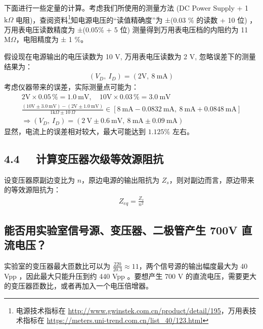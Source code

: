 \documentclass[UTF8]{article}
\begin{document}
下面进行一些定量的计算。考虑我们所使用的测量方法 (DC Power Supply + 1 $\mathrm{k}\Omega$ 电阻)，查阅资料\footnote{电源技术指标在 \href{http://www.gwinstek.com.cn/product/detail/195}{http://www.gwinstek.com.cn/product/detail/195}，万用表技术指标在 \href{https://meters.uni-trend.com.cn/list\_40/123.html}{https://meters.uni-trend.com.cn/list\_40/123.html}}知电源电压的“读值精确度”为 ±(0.03 \% 的读数 + 10 位) ，万用表电压读数精度为 ±(0.05\% + 5 位) 测量得到万用表电压档的内阻约为 11 $\mathrm{M}\Omega$，电阻精度为 ± 1 \%。

假设现在电源输出的电压读数为 10 V, 万用表电压读数为 2 V, 忽略误差下的测量结果为：
\begin{gather}
(V_D,\ I_D) = (2 \mathrm{V},\ 8 \ \mathrm{mA})
\end{gather}
考虑仪器带来的误差，实际测量点可能为：
\begin{gather}
    2 \mathrm{V} \times 0.05\, \% = 1.0 \ \mathrm{mV}, \quad 
    10 \mathrm{V} \times 0.03\, \% = 3.0 \ \mathrm{mV}
    \\
    \frac{
        (10 \mathrm{V} \pm 3.0 \ \mathrm{mV}) - (2 \mathrm{V} \pm 1.0 \ \mathrm{mV})
        }{
        1 \mathrm{k}\Omega \pm 10 \ \Omega
    } \in [8 \ \mathrm{mA}- 0.0832 \ \mathrm{mA},\  8 \ \mathrm{mA} + 0.0848 \ \mathrm{mA}] 
    \\
    \Longrightarrow 
(V_D,\ I_D) = (2 \ \mathrm{V} \pm 0.6 \ \mathrm{mV},\ 8 \ \mathrm{mA} \pm 0.09 \ \mathrm{mA})
\end{gather}
显然，电流上的误差相对较大，最大可能达到 $1.125 \%$ 左右。

\subsection*{4.4 \ \ 计算变压器次级等效源阻抗}

设变压器原副边变比为 $n$，原边电源的输出阻抗为 $Z_s$，则对副边而言，原边带来的等效源阻抗为：
\begin{gather}
    Z_{eq} = \frac{Z_s}{n^2}
\end{gather}

\subsection*{能否用实验室信号源、变压器、二极管产生 700V 直流电压？}

实验室的变压器最大匝数比可以为 $\frac{220}{20.3} \approx 11$，两个信号源的输出幅度最大为 40 Vpp ，因此最大只能升压到约 440 Vpp 。要想产生 700 V 的直流电压，需要更大的变压器匝数比，或者再加入一个电压倍增器。
\end{document}
